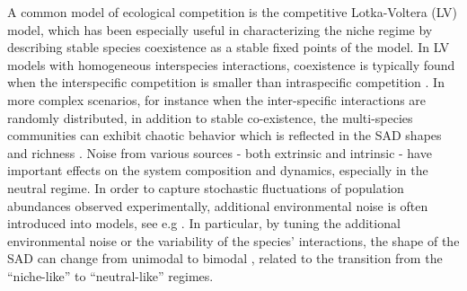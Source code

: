 \documentclass[9pt,twocolumn,twoside,lineno]{pnas-new}
\begin{document}
A common model of ecological competition is the competitive Lotka-Voltera (LV) model, which has been especially useful in characterizing the niche regime by describing stable species coexistence as a stable fixed points of the model.  %
In LV models with homogeneous interspecies interactions, coexistence is typically found when the interspecific competition is smaller than intraspecific competition \cite{hardin1960competitive,macarthur1967limiting,MacArthur1969species, gause2019struggle}.
In more complex scenarios, for instance when the inter-specific interactions are randomly distributed, in addition to stable co-existence, the multi-species communities can exhibit chaotic behavior which is reflected in the SAD shapes and richness \cite{scheffer2006self,vergnon2012emergent,kessler2015generalized,bunin2016interaction,roy2019can}. 
Noise from various sources - both extrinsic and intrinsic - have important effects on the system composition and dynamics, especially in the neutral regime. 
In order to capture stochastic fluctuations of population abundances observed experimentally, additional environmental noise is often introduced into models, see e.g \cite{fisher2014transition,lynch2015ecology,verberk2011explaining,fowler2013colonization,barabas2016effect}.
In particular, by tuning the additional environmental noise or the variability of the species' interactions, the shape of the SAD can change from unimodal to bimodal \cite{fisher2014transition}, related to the transition from the ``niche-like'' to ``neutral-like'' regimes.
\end{document}
